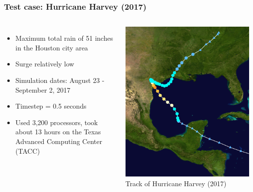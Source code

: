 \documentclass[10pt]{oden_beamer}
\begin{document}
\begin{frame}
  \frametitle{Test case: Hurricane Harvey (2017)}
  \begin{columns}
  \begin{itemize}
  \item Maximum total rain of 51 inches in the Houston city area
  \item Surge relatively low
  \item Simulation dates: August 23 - September 2, 2017
  \item Timestep = 0.5 seconds
  \item Used 3,200 processors, took about 13 hours on the Texas Advanced Computing Center (TACC)
  \end{itemize}

  \centering
  \includegraphics[width=0.8\linewidth]{harvey_cropped.png} \\
  \footnotesize Track of Hurricane Harvey (2017)
  \end{columns}

\end{frame}
\end{document}
